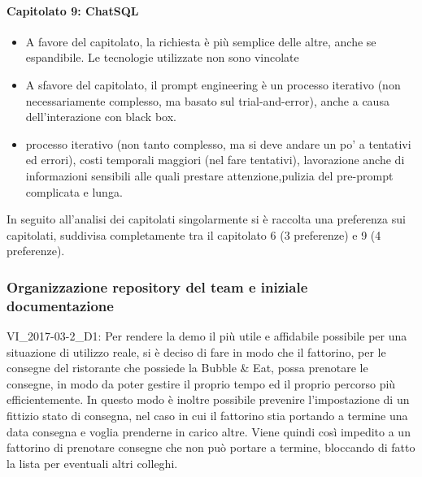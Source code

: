 \paragraph{Capitolato 9: ChatSQL}
\begin{itemize}
	\item A favore del capitolato, la richiesta è più semplice delle altre, anche se espandibile. Le tecnologie utilizzate non sono vincolate
	\item A sfavore del capitolato, il prompt engineering è un processo iterativo (non necessariamente complesso, ma basato sul trial-and-error), anche a causa dell’interazione con black box.
	\item processo iterativo (non tanto complesso, ma si deve andare un po' a tentativi ed errori), costi temporali maggiori (nel fare tentativi), lavorazione anche di informazioni sensibili alle quali prestare attenzione,pulizia del pre-prompt complicata e lunga.
\end{itemize}

In seguito all’analisi dei capitolati singolarmente si è raccolta una preferenza sui capitolati, suddivisa completamente tra il capitolato 6 (3 preferenze) e 9 (4 preferenze).

\subsubsection{Organizzazione repository del team e iniziale documentazione}
VI\_2017-03-2\_D1: Per rendere la demo il più utile e affidabile possibile per una situazione di utilizzo reale, si è deciso di fare in modo che il fattorino, per le consegne del ristorante che possiede la Bubble \& Eat, possa prenotare le consegne, in modo da poter gestire il proprio tempo ed il proprio percorso più efficientemente. In questo modo è inoltre possibile prevenire l'impostazione di un fittizio stato di consegna, nel caso in cui il fattorino stia portando a termine una data consegna e voglia prenderne in carico altre. Viene quindi così impedito a un fattorino di prenotare consegne che non può portare a termine, bloccando di fatto la lista per eventuali altri colleghi.

\clearpage
